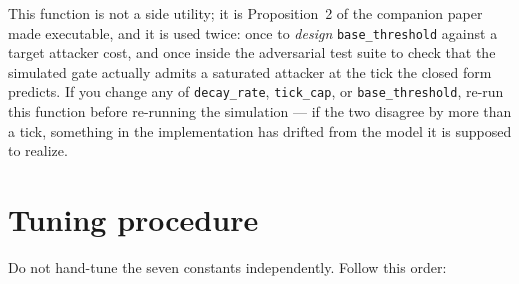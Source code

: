 \documentclass[11pt]{article}
\begin{document}
This function is not a side utility; it is Proposition~2 of the
companion paper made executable, and it is used twice: once to
\emph{design} \texttt{base\_threshold} against a target attacker cost,
and once inside the adversarial test suite to check that the simulated
gate actually admits a saturated attacker at the tick the closed form
predicts. If you change any of \texttt{decay\_rate}, \texttt{tick\_cap},
or \texttt{base\_threshold}, re-run this function before re-running the
simulation --- if the two disagree by more than a tick, something in the
implementation has drifted from the model it is supposed to realize.

\section{Tuning procedure}
\label{sec:tuning}

Do not hand-tune the seven constants independently. Follow this order:
\end{document}
